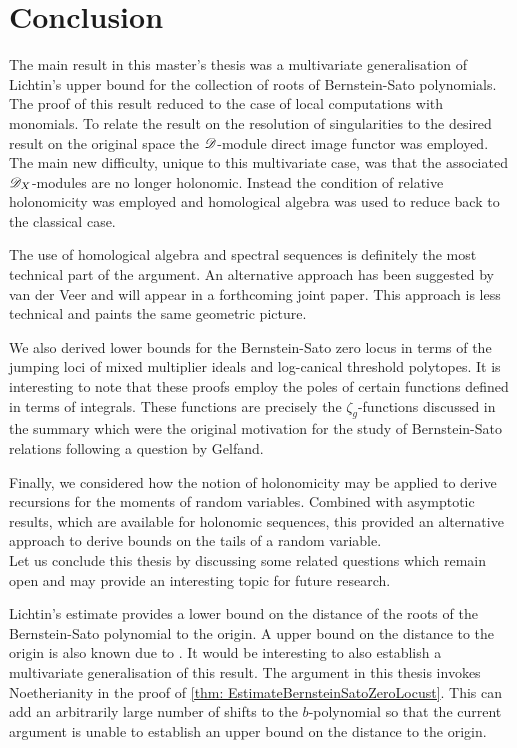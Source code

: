 \chapter{Conclusion}
The main result in this master's thesis was a multivariate generalisation of Lichtin's upper bound for the collection of roots of Bernstein-Sato polynomials.
The proof of this result reduced to the case of local computations with monomials.
To relate the result on the resolution of singularities to the desired result on the original space the $\mathscr{D}$-module direct image functor was employed. 
The main new difficulty, unique to this multivariate case, was that the associated $\mathscr{D}_X$-modules are no longer holonomic. 
Instead the condition of relative holonomicity was employed and homological algebra was used to reduce back to the classical case. 

The use of homological algebra and spectral sequences is definitely the most technical part of the argument. 
An alternative approach has been suggested by van der Veer and will appear in a forthcoming joint paper. 
This approach is less technical and paints the same geometric picture. 

We also derived lower bounds for the Bernstein-Sato zero locus in terms of the jumping loci of mixed multiplier ideals and log-canical threshold polytopes. 
It is interesting to note that these proofs employ the poles of certain functions defined in terms of integrals. 
These functions are precisely the $\zeta_g$-functions discussed in the summary which were the original motivation for the study of Bernstein-Sato relations following a question by Gelfand. 

Finally, we considered how the notion of holonomicity may be applied to derive recursions for the moments of random variables. 
Combined with asymptotic results, which are available for holonomic sequences, this provided an alternative approach to derive bounds on the tails of a random variable. \\ 

\noindent
Let us conclude this thesis by discussing some related questions which remain open and may provide an interesting topic for future research. 

Lichtin's estimate provides a lower bound on the distance of the roots of the Bernstein-Sato  polynomial to the origin.
A upper bound on the distance to the origin is also known due to \cite{saito2006introduction}.
It would be interesting to also establish a multivariate generalisation of this result. 
The argument in this thesis invokes Noetherianity in the proof of \cref{thm: EstimateBernsteinSatoZeroLocust}. 
This can add an arbitrarily large number of shifts to the $b$-polynomial so that the current argument is unable to establish an upper bound on the distance to the origin. 

